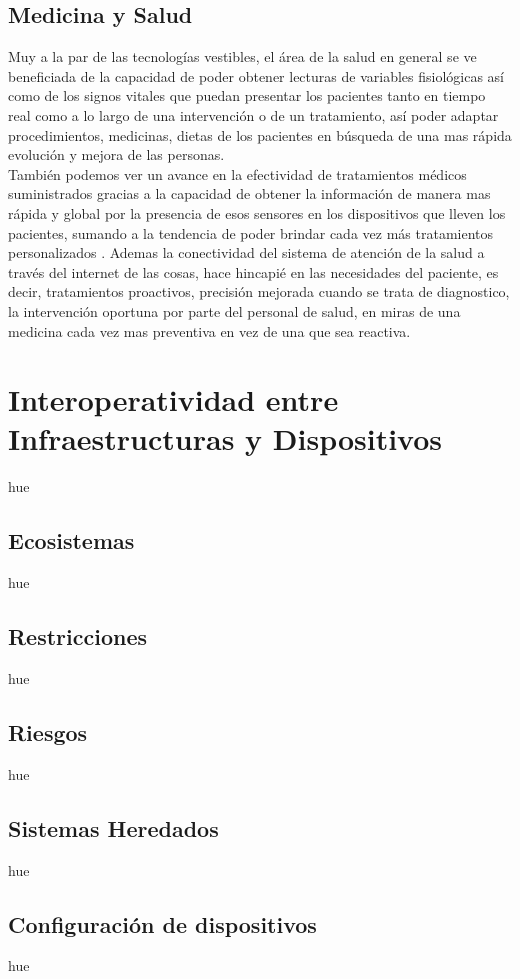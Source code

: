 \subsection{Medicina y Salud}
Muy a la par de las tecnologías vestibles, el área de la salud en general se ve beneficiada de la capacidad de poder obtener lecturas de variables fisiológicas así como de los signos vitales que puedan presentar los pacientes  tanto en tiempo real como a lo largo de una intervención o de un tratamiento, así poder adaptar procedimientos, medicinas, dietas de los pacientes en búsqueda de una mas rápida evolución y mejora de las personas.\\

También podemos ver un avance en la efectividad de tratamientos médicos suministrados gracias a la capacidad de obtener la información de manera mas rápida y global por la presencia de esos sensores en los dispositivos que lleven los pacientes, sumando a la tendencia de poder brindar cada vez más tratamientos personalizados \cite{ibmiotmedicina}. Ademas la conectividad del sistema de atención de la salud a través del internet de las cosas, hace hincapié en las necesidades del paciente, es decir, tratamientos proactivos, precisión mejorada cuando se trata de diagnostico, la intervención oportuna por parte del personal de salud, en miras de una medicina cada vez mas preventiva en vez de una que sea reactiva. 

\section{Interoperatividad entre Infraestructuras y Dispositivos}
hue
\subsection{Ecosistemas}
hue
\subsection{Restricciones}
hue
\subsection{Riesgos}
hue
\subsection{Sistemas Heredados}
hue
\subsection{Configuración de dispositivos}
hue

